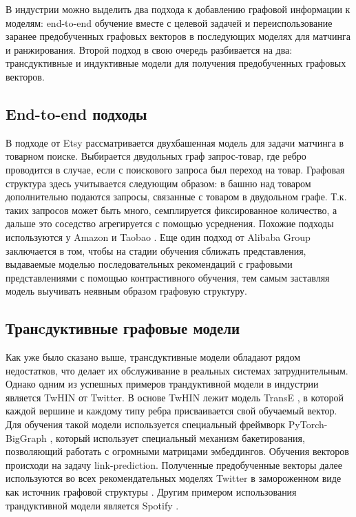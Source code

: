 \documentclass{article}
\begin{document}
В индустрии можно выделить два подхода к добавлению графовой информации к моделям: end-to-end обучение вместе с целевой задачей и переиспользование
заранее предобученных графовых векторов в последующих моделях для матчинга и ранжирования. Второй подход в свою очередь разбивается на два: трансдуктивные
и индуктивные модели для получения предобученных графовых векторов.

\subsection{End-to-end подходы}

В подходе от Etsy \cite{etsy} рассматривается двухбашенная модель для задачи матчинга в товарном поиске. Выбирается двудольных граф запрос-товар, где ребро 
проводится в случае, если с поискового запроса был переход на товар. Графовая структура здесь учитывается следующим образом: в башню над товаром дополнительно подаются запросы, 
связанные с товаром в двудольном графе. Т.к. таких запросов может быть много, семплируется фиксированное количество, а дальше это соседство агрегируется с помощью
усреднения. Похожие подходы используются у Amazon \cite{amazon} и Taobao \cite{taobao}. Еще один подход от Alibaba Group \cite{alibaba} заключается в том, чтобы на стадии 
обучения сближать представления, выдаваемые моделью последовательных рекомендаций с графовыми представлениями с помощью 
контрастивного обучения, тем самым заставляя модель выучивать неявным образом графовую структуру.


\subsection{Транcдуктивные графовые модели}

Как уже было сказано выше, трансдуктивные модели обладают рядом недостатков, что делает их обслуживание в реальных системах затруднительным.
Однако одним из успешных примеров трандуктивной модели в индустрии является TwHIN \cite{twhin} от Twitter. В основе TwHIN лежит модель TransE \cite{transe},
в которой каждой вершине и каждому типу ребра присваивается свой обучаемый вектор. Для обучения такой модели используется специальный фреймворк PyTorch-BigGraph \cite{biggraph},
который использует специальный механизм бакетирования, позволяющий работать с огромными матрицами эмбеддингов. Обучения векторов происходи на задачу 
link-prediction. Полученные предобученные векторы далее используются во всех рекомендательных моделях Twitter в замороженном виде как источник графовой структуры \cite{twhinbert,twerc}.
Другим примером использования трандуктивной модели является Spotify \cite{spotify}.
\end{document}

